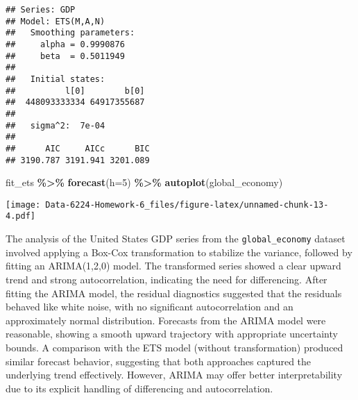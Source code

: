 \documentclass[
]{article}
\newenvironment{Shaded}{\begin{snugshade}}{\end{snugshade}}
\newcommand{\AttributeTok}[1]{\textcolor[rgb]{0.13,0.29,0.53}{#1}}
\newcommand{\DecValTok}[1]{\textcolor[rgb]{0.00,0.00,0.81}{#1}}
\newcommand{\FunctionTok}[1]{\textcolor[rgb]{0.13,0.29,0.53}{\textbf{#1}}}
\newcommand{\NormalTok}[1]{#1}
\newcommand{\SpecialCharTok}[1]{\textcolor[rgb]{0.81,0.36,0.00}{\textbf{#1}}}
\begin{document}
\begin{verbatim}
## Series: GDP 
## Model: ETS(M,A,N) 
##   Smoothing parameters:
##     alpha = 0.9990876 
##     beta  = 0.5011949 
## 
##   Initial states:
##          l[0]        b[0]
##  448093333334 64917355687
## 
##   sigma^2:  7e-04
## 
##      AIC     AICc      BIC 
## 3190.787 3191.941 3201.089
\end{verbatim}

\begin{Shaded}
\begin{Highlighting}[]
\NormalTok{fit\_ets }\SpecialCharTok{\%\textgreater{}\%}
  \FunctionTok{forecast}\NormalTok{(}\AttributeTok{h=}\DecValTok{5}\NormalTok{) }\SpecialCharTok{\%\textgreater{}\%}
  \FunctionTok{autoplot}\NormalTok{(global\_economy)}
\end{Highlighting}
\end{Shaded}

\texttt{[image: Data-6224-Homework-6\_files/figure-latex/unnamed-chunk-13-4.pdf]}

The analysis of the United States GDP series from the
\texttt{global\_economy} dataset involved applying a Box-Cox
transformation to stabilize the variance, followed by fitting an
ARIMA(1,2,0) model. The transformed series showed a clear upward trend
and strong autocorrelation, indicating the need for differencing. After
fitting the ARIMA model, the residual diagnostics suggested that the
residuals behaved like white noise, with no significant autocorrelation
and an approximately normal distribution. Forecasts from the ARIMA model
were reasonable, showing a smooth upward trajectory with appropriate
uncertainty bounds. A comparison with the ETS model (without
transformation) produced similar forecast behavior, suggesting that both
approaches captured the underlying trend effectively. However, ARIMA may
offer better interpretability due to its explicit handling of
differencing and autocorrelation.
\end{document}

